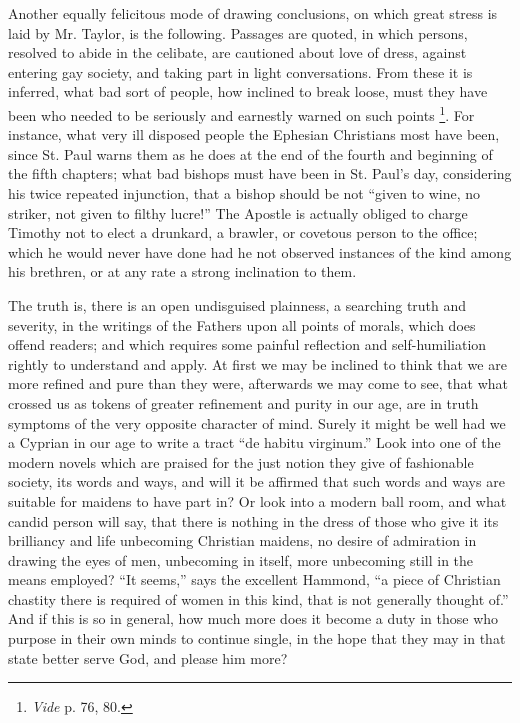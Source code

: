 Another equally felicitous mode of drawing
conclusions, on which great stress is laid by Mr. Taylor, is the
following. Passages are quoted, in which persons, resolved to abide in
the celibate, are cautioned about love of dress, against entering gay
society, and taking part in light conversations. From these it is
inferred, what bad sort of people, how inclined to break loose, must
they have been who needed to be seriously and earnestly warned on such
points \footnote{\emph{Vide} p. 76, 80.}. For instance, what
very ill disposed people the Ephesian Christians most have been, since
St. Paul warns them as he does at the end of the fourth and beginning of
the fifth chapters; what bad bishops must have been in St. Paul's day,
considering his twice repeated injunction, that a bishop should be not ``given
to wine, no striker, not given to filthy lucre!'' The Apostle is actually
obliged to charge Timothy not to elect a drunkard, a brawler, or
covetous person to the office; which he would never have done had he not
observed instances of the kind among his brethren, or at any rate a
strong inclination to them.

The truth is, there is an open undisguised
plainness, a searching truth and severity, in the writings of the
Fathers upon all points of morals, which does offend readers; and which
requires some painful reflection and self-humiliation rightly to
understand and apply. At first we may be inclined to think that we are
more refined and pure than they were, afterwards we may come to see,
that what crossed us as tokens of greater refinement and purity in our
age, are in truth symptoms of the very opposite character of mind.
Surely it might be well had we a Cyprian in our age to write a tract ``de
habitu virginum.'' Look into one of the modern novels which are praised
for the just notion they give of fashionable society, its words and
ways, and will it be affirmed that such words and ways are suitable for
maidens to have part in? Or look into a modern ball room, and what
candid person will say, that there is nothing in the dress of those who
give it its brilliancy and life unbecoming Christian maidens, no desire
of admiration in drawing the eyes of men, unbecoming in itself, more
unbecoming still in the means employed? ``It seems,'' says the excellent
Hammond, ``a piece of Christian chastity there is required of women in
this kind, that is not generally thought of.'' And if this is so in
general, how much more does it become a duty in those who purpose in
their own minds to continue single, in the hope that they may in that
state better serve God, and please him more?


